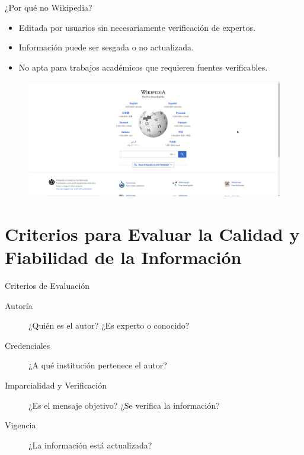 \documentclass[
11pt, %
]{beamer}
\begin{document}
\begin{frame}{¿Por qué no Wikipedia?}
	\begin{itemize}
		\item Editada por usuarios sin necesariamente verificación de expertos.
		\item Información puede ser sesgada o no actualizada.
		\item No apta para trabajos académicos que requieren fuentes verificables.
	\end{itemize}

	\begin{figure}[H]
		\centering
		\includegraphics[width=1\linewidth]{images/image07}
	\end{figure}
\end{frame}

\section{Criterios para Evaluar la Calidad y Fiabilidad de la Información}

\begin{frame}{Criterios de Evaluación}
	\begin{description}
		\item[Autoría] ¿Quién es el autor? ¿Es experto o conocido?
		\item[Credenciales] ¿A qué institución pertenece el autor?
		\item[Imparcialidad y Verificación] ¿Es el mensaje objetivo? ¿Se verifica la información?
		\item[Vigencia] ¿La información está actualizada?
	\end{description}
\end{frame}
\end{document}
